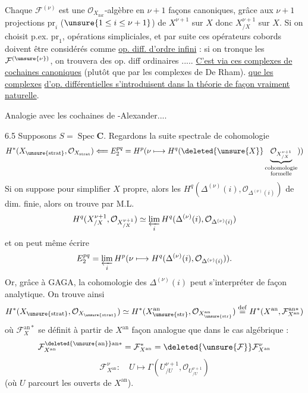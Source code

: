Chaque $\mathcal F^{(\nu)}$ est une $\mathcal O_{X_{\mathrm{zar}}}$-algèbre en $\nu+1$ façons canoniques, grâce aux $\nu+1$ projections $\mathrm{pr}_i$ ($\unsure{1\le i\le\nu+1}$) de $X^{\nu+1}$ sur $X$ donc $X^{\nu+1}_{/X}$ sur $X$. Si on choisit p.ex. $\mathrm{pr}_1$,  opérations simpliciales, et par suite ces opérateurs cobords doivent être considérés comme \uline{op. diff. d'ordre infini} : si on tronque les $\mathcal F^{(\unsure{\nu})}$, on trouvera des op. diff ordinaires ..... \uline{C'est via ces complexes de cochaines canoniques} (plutôt que par les complexes de De Rham). \uline{que les complexes}
\uline{d'op. différentielles s'introduisent dans la théorie de façon vraiment naturelle}.

Analogie avec les cochaines de -Alexander....

6.5 Supposons $S=\operatorname{Spec}\mathbf C$. Regardons la suite spectrale de cohomologie 
\[
H^*(X_{\unsure{\mathrm{strat}}},\mathcal O_{X_{\mathrm{strat}}})\Longleftarrow E_2^{pq}
=H^p(\nu\longmapsto H^q(\deleted{\unsure{X}}\underbrace{\mathcal O_{X^{\nu+1}_{/X}}}_{\substack{\text{cohomologie}\\\text{formelle}}}))
\]
Si on suppose pour simplifier $X$ propre, alors les $H^q(\Delta^{(\nu)}(i),\mathcal O_{\Delta^{(\nu)}(i)})$ de dim. finie, alors on trouve par M.L.
\[
H^q(X^{\nu+1}_{/X},\mathcal O_{X^{\nu+1}_{/X}})\simeq\varprojlim_i H^q(\Delta^{(\nu)}(i),\mathcal O_{\Delta^{(\nu)}(i)})
\]
et on peut même écrire
\[
E_2^{pq}=\varprojlim_i H^p(\nu\longmapsto H^q(\Delta^{(\nu)}(i),\mathcal O_{\Delta^{(\nu)}(i)})).
\]
Or, grâce à GAGA, la cohomologie des $\Delta^{(\nu)}(i)$ peut s'interpréter de façon analytique. On trouve ainsi
\[
H^*(X_{\unsure{\mathrm{strat}}},\mathcal O_{X_{\unsure{\mathrm{strat}}}})
\simeq H^*(X^{\mathrm{an}}_{\unsure{\mathrm{str}}},\mathcal O_{X^{\mathrm{an}}_{\unsure{\mathrm{str}}}})
\overset{\mathrm{def}}{=}H^*(X^{\mathrm{an}},\mathcal F_{X^{\mathrm{an}}}^{\mathrm{an}*})
\]
où $\mathcal F_X^{\mathrm{an}*}$ se  définit à partir de $X^{\mathrm{an}}$  façon analogue que dans le cas algébrique :
\[
\mathcal F_{X^{\mathrm{an}}}^{\deleted{\unsure{\mathrm{an}}}\mathrm{an}*}
=\mathcal F_{X^{\mathrm{an}}}^*
=\deleted{\unsure{\mathcal F}}\mathcal F_{X^{\mathrm{an}}}^{\nu}
\]
\[
\mathcal F_{X^{\mathrm{an}}}^{\nu}:\quad U\longmapsto\Gamma(U^{\nu+1}_{/U},\mathcal O_{U^{\nu+1}_{/U}})
\]
(où $U$ parcourt les ouverts de $X^{\mathrm{an}}$).

